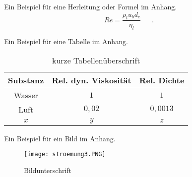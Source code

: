 \label{ch:Anhang}

Ein Beispiel für eine Herleitung oder Formel im Anhang.
\begin{equation}
	Re= \frac{\rho_l u_b d_e}{\eta_l} \ \ \ \ \ \ \ \mbox{.}
\end{equation}

Ein Beispiel für eine Tabelle im Anhang.
\begin{table}[htbp]
\caption{kurze Tabellenüberschrift}
	\label{tab:xyz3}
	\centering
	\footnotesize
	\sffamily
		\begin{tabular}{|c||c|c|}
			\hline
			Substanz & Rel. dyn. Viskosität & Rel. Dichte \\ \hline\hline
			 Wasser  &       $  1   $       & $    1   $  \\ \hline
			  Luft   &       $ 0,02 $       & $ 0,0013 $  \\ \hline
			  $x$    &       $  y   $       & $    z   $  \\ \hline
		\end{tabular}
\end{table}

Ein Beispiel für ein Bild im Anhang.
\begin{figure}[ht]
  \centering
    \texttt{[image: stroemung3.PNG]}
  \caption{Bildunterschrift}
  \label{fig:bild4}
\end{figure}
